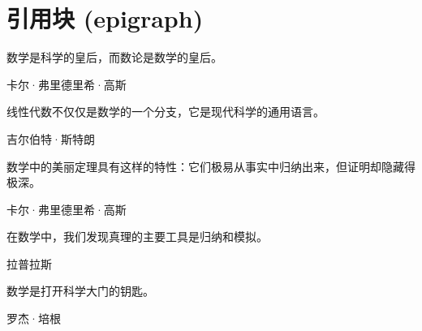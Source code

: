 \section{引用块 (epigraph)}

\epigraph{数学是科学的皇后，而数论是数学的皇后。}{卡尔·弗里德里希·高斯}

\epigraph{线性代数不仅仅是数学的一个分支，它是现代科学的通用语言。}{吉尔伯特·斯特朗}

\epigraph{数学中的美丽定理具有这样的特性：它们极易从事实中归纳出来，但证明却隐藏得极深。}{卡尔·弗里德里希·高斯}

\epigraph{在数学中，我们发现真理的主要工具是归纳和模拟。}{拉普拉斯}

\epigraph{数学是打开科学大门的钥匙。}{罗杰·培根}
